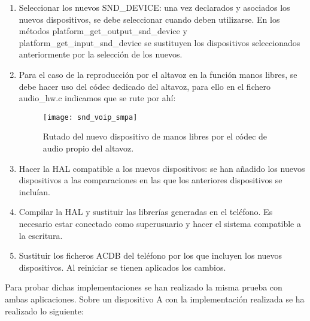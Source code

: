 \begin{enumerate}
\begin{figure}[H]
	\end{figure}
	\item Seleccionar los nuevos SND\_DEVICE: una vez declarados y asociados los nuevos dispositivos, se debe seleccionar cuando deben utilizarse. En los métodos platform\_get\_output\_snd\_device y platform\_get\_input\_snd\_device se sustituyen los dispositivos seleccionados anteriormente por la selección de los nuevos.
	\item Para el caso de la reproducción por el altavoz en la función manos libres, se debe hacer uso del códec dedicado del altavoz, para ello en el fichero audio\_hw.c indicamos que se rute por ahí:
	\begin{figure}[H]
		\centering
		\texttt{[image: snd\_voip\_smpa]}
		\caption{Rutado del nuevo dispositivo de manos libres por el códec de audio propio del altavoz.} 
		\label{fig:snd_voip_smpa}
	\end{figure}
	\item Hacer la \gls{HAL} compatible a los nuevos dispositivos: se han añadido los nuevos dispositivos a las comparaciones en las que los anteriores dispositivos se incluían.
	\item Compilar la \gls{HAL} y sustituir las librerías generadas en el teléfono. Es necesario estar conectado como superusuario y hacer el sistema compatible a la escritura.
	\item Sustituir los ficheros \gls{ACDB} del teléfono por los que incluyen los nuevos dispositivos. Al reiniciar se tienen aplicados los cambios.
\end{enumerate}

Para probar dichas implementaciones se han realizado la misma prueba con ambas aplicaciones. Sobre un dispositivo A con la implementación realizada se ha realizado lo siguiente: 

